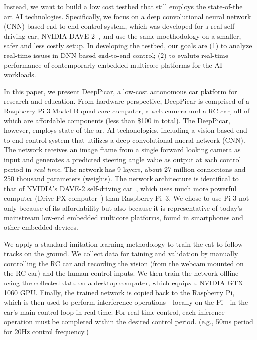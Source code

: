 Instead, we want to build a low cost testbed that still employs the
state-of-the art AI technologies. Specifically, we focus on a deep
convolutional neural network (CNN) based end-to-end control system,
which was developed for a real self-driving car, NVIDIA
DAVE-2~\cite{Bojarski2016}, and use the same moethodology on a
smaller, safer and less costly setup. In developing the testbed, our
goals are (1) to analyze real-time issues in DNN based end-to-end
control; (2) to evalute real-time performance of contemporarly embedded
multicore platforms for the AI workloads.

In this paper, we present DeepPicar, a low-cost autonomous car
platform for research and education. From hardware perspective, 
DeepPicar is comprised of a Raspberry Pi 3 Model B quad-core
computer, a web camera and a RC car, all of which are affordable
components (less than \$100 in total).
The DeepPicar, however, employs state-of-the-art AI
techonologies, including a vision-based end-to-end control system that
utilizes a deep convolutional nueral network (CNN).
The network receives an image frame from a single forward
looking camera as input and generates a predicted steering angle
value as output at each control period in \emph{real-time}. 
The network has 9 layers, about 27 million connections
and 250 thousand parameters (weights).
The network architecture is identifical to that of NVIDIA's DAVE-2
self-driving car~\cite{Bojarski2016}, which uses much more powerful
computer (Drive PX computer~\cite{drivepx}) than Raspberry Pi~3.
We chose to use Pi 3 not only because of its
affordability but also because it is representative
of today's mainstream low-end embedded multicore platforms, found in
smartphones and other embedded devices.


We apply a standard imitation learning methodology to train the cat to
follow tracks on the ground. We collect data for 
taining and validation by manually  
controlling the RC car and recording the vision (from the webcam
mounted on the RC-car) and the human control inputs. We then train the
network offline using the collected data on a desktop computer, which
equips a NVIDIA GTX 1060 GPU. Finally, the trained network is copied
back to the Raspberry Pi, which is then used to perform interference
operations---locally on the Pi---in the car's main control loop in
real-time. For real-time control, each inference operation must
be completed within the desired control period. (e.g., 50ms period for
20Hz control frequency.)

